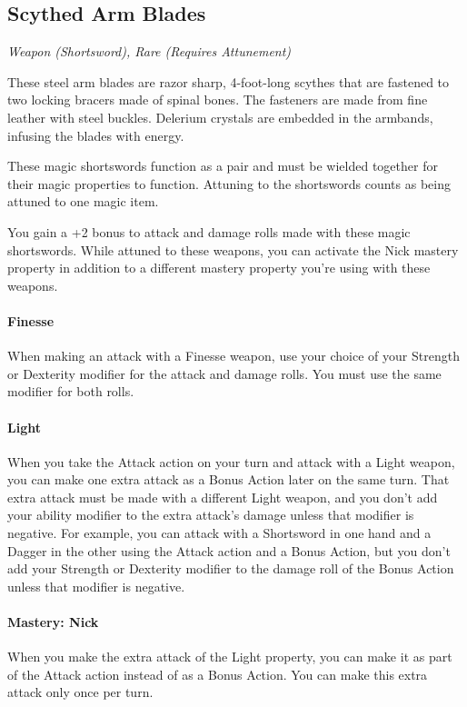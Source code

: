 \documentclass[letterpaper,openany,oneside,twocolumn]{book}
\begin{document}
\subsection*{Scythed Arm Blades}
\textit{Weapon (Shortsword), Rare (Requires Attunement)}\\
{\entryfont These steel arm blades are razor sharp, 4-foot-long scythes that are fastened to two locking bracers made of spinal bones. The fasteners are made from fine leather with steel buckles. Delerium crystals are embedded in the armbands, infusing the blades with energy.

These magic shortswords function as a pair and must be wielded together for their magic properties to function. Attuning to the shortswords counts as being attuned to one magic item.

You gain a +2 bonus to attack and damage rolls made with these magic shortswords. While attuned to these weapons, you can activate the Nick mastery property in addition to a different mastery property you're using with these weapons.

\paragraph*{Finesse} When making an attack with a Finesse weapon, use your choice of your Strength or Dexterity modifier for the attack and damage rolls. You must use the same modifier for both rolls.

\paragraph*{Light} When you take the Attack action on your turn and attack with a Light weapon, you can make one extra attack as a Bonus Action later on the same turn. That extra attack must be made with a different Light weapon, and you don't add your ability modifier to the extra attack's damage unless that modifier is negative. For example, you can attack with a Shortsword in one hand and a Dagger in the other using the Attack action and a Bonus Action, but you don't add your Strength or Dexterity modifier to the damage roll of the Bonus Action unless that modifier is negative.

\paragraph*{Mastery: Nick} When you make the extra attack of the Light property, you can make it as part of the Attack action instead of as a Bonus Action. You can make this extra attack only once per turn.}
\end{document}
